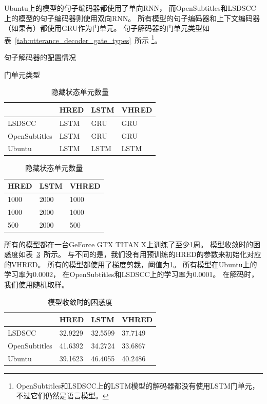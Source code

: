 Ubuntu上的模型的句子编码器都使用了单向RNN，
而OpenSubtitles和LSDSCC上的模型的句子编码器则使用双向RNN。
所有模型的句子编码器和上下文编码器（如果有）都使用GRU作为门单元。
句子解码器的门单元类型如表~\ref{tab:utterance_decoder_gate_types}~所示
\footnote{OpenSubtitles和LSDSCC上的LSTM模型的解码器都没有使用LSTM门单元，不过它们仍然是语言模型。}。
\begin{table}
    \centering
    \caption{句子解码器的配置情况}
    \setlength{\tabcolsep}{0.11cm}%
    \begin{subtable}{0.5\linewidth}
        \centering
        \caption{门单元类型}
        \label{tab:utterance_decoder_gate_types}
        \begin{tabular}{llll}
            \toprule
            \midrule
            & HRED & LSTM & VHRED \\
            \midrule
            LSDSCC & LSTM & GRU & GRU \\
            OpenSubtitles & LSTM & GRU & GRU \\
            Ubuntu & LSTM & LSTM & LSTM \\
            \bottomrule
        \end{tabular}
    \end{subtable}%
    \begin{subtable}{0.4\linewidth}
        \centering
        \caption{隐藏状态单元数量}
        \label{tab:utterance_decoder_hidden_units}
        \begin{tabular}{lll}
            \toprule
            \midrule
            HRED & LSTM & VHRED \\
            \midrule
            1000 & 2000 & 1000 \\
            1000 & 2000 & 1000 \\
            500 & 2000 & 500 \\
            \bottomrule
        \end{tabular}
    \end{subtable}
\end{table}

所有的模型都在一台GeForce GTX TITAN X上训练了至少1周。
模型收敛时的困惑度如表~\ref{tab:converged_perplexity}~所示。
与不同的是，我们没有用预训练的HRED的参数来初始化对应的VHRED。
所有的模型都使用了梯度剪裁，阈值为1。
所有模型在Ubuntu上的学习率为0.0002，
在OpenSubtitles和LSDSCC上的学习率为0.0001。
在解码时，我们使用随机取样。
\begin{table}
    \centering
    \caption{模型收敛时的困惑度}
    \label{tab:converged_perplexity}
    \begin{tabular}{llll}
        \toprule
        \midrule
        & HRED & LSTM & VHRED \\
        \midrule
        LSDSCC & 32.9229 & 32.5599 & 37.7149 \\
        OpenSubtitles & 41.6392 & 34.2724 & 33.6867 \\
        Ubuntu & 39.1623 & 46.4055 & 40.2486 \\
        \bottomrule
    \end{tabular}
\end{table}

